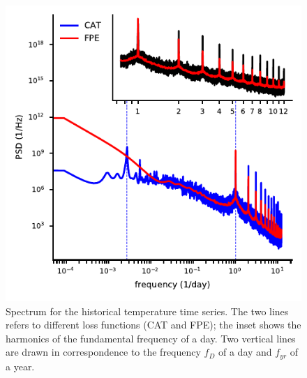 \documentclass[twocolumn,showpacs,preprintnumbers,nofootinbib,prd,
superscriptaddress,10pt]{revtex4-1}
\begin{document}
\begin{figure}
	\caption{Spectrum for the historical temperature time series. The two lines refers to different loss functions (CAT and FPE); the inset shows the harmonics of the fundamental frequency of a day. Two vertical lines are drawn in correspondence to the frequency $f_D$ of a day and $f_{yr}$ of a year.}
	\label{fig:temp_spectrum}
	\includegraphics{Images/climate_plots/temp_spectrum.pdf}
\end{figure}
\end{document}
